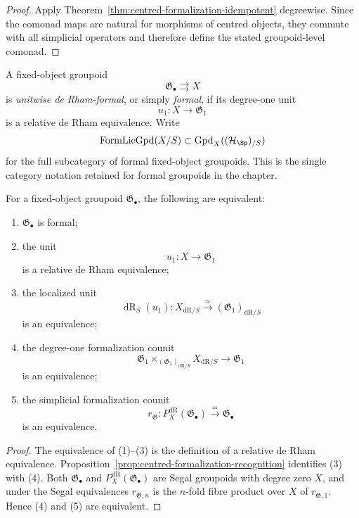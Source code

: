\begin{proof}
Apply Theorem~\ref{thm:centred-formalization-idempotent} degreewise.  Since the
comonad maps are natural for morphisms of centred objects, they commute with
all simplicial operators and therefore define the stated groupoid-level
comonad.
\end{proof}

\begin{definition}
\label{def:unitwise-formal-groupoid}
A fixed-object groupoid
\[
    \mathfrak G_\bullet\rightrightarrows X
\]
is \emph{unitwise de Rham-formal}, or simply \emph{formal}, if its
degree-one unit
\[
    u_1:X\longrightarrow\mathfrak G_1
\]
is a relative de Rham equivalence.  Write
\[
    \operatorname{FormLieGpd}(X/S)
    \subset
    \operatorname{Gpd}_X((\mathcal H_{\Sp})_{/S})
\]
for the full subcategory of formal fixed-object groupoids.  This is the
single category notation retained for formal groupoids in the chapter.
\end{definition}

\begin{proposition}
\label{prop:degree-one-formality}
For a fixed-object groupoid $\mathfrak G_\bullet$, the following are
equivalent:
\begin{enumerate}
    \item $\mathfrak G_\bullet$ is formal;
    \item the unit
    \[
        u_1:X\longrightarrow\mathfrak G_1
    \]
    is a relative de Rham equivalence;
    \item the localized unit
    \[
        \operatorname{dR}_S(u_1):
        X_{\mathrm{dR}/S}
        \xrightarrow{\simeq}
        (\mathfrak G_1)_{\mathrm{dR}/S}
    \]
    is an equivalence;
    \item the degree-one formalization counit
    \[
        \mathfrak G_1
        \times_{(\mathfrak G_1)_{\mathrm{dR}/S}}
        X_{\mathrm{dR}/S}
        \longrightarrow
        \mathfrak G_1
    \]
    is an equivalence;
    \item the simplicial formalization counit
    \[
        r_{\mathfrak G}:
        P_X^{\mathrm{dR}}(\mathfrak G_\bullet)
        \xrightarrow{\simeq}
        \mathfrak G_\bullet
    \]
    is an equivalence.
\end{enumerate}
\end{proposition}

\begin{proof}
The equivalence of (1)--(3) is the definition of a relative de Rham
equivalence.  Proposition~\ref{prop:centred-formalization-recognition} identifies
(3) with (4).  Both $\mathfrak G_\bullet$ and
$P_X^{\mathrm{dR}}(\mathfrak G_\bullet)$ are Segal groupoids with
degree zero $X$, and under the Segal equivalences
$r_{\mathfrak G,n}$ is the $n$-fold fibre product over $X$ of
$r_{\mathfrak G,1}$.  Hence (4) and (5) are equivalent.
\end{proof}

